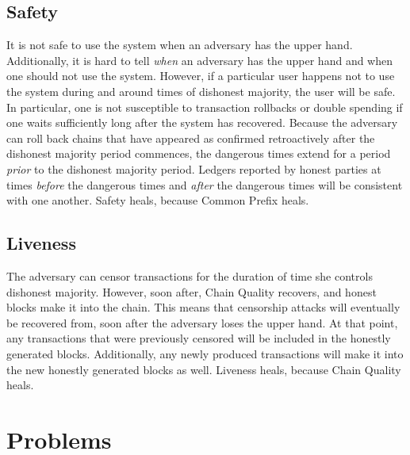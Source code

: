\subsection*{Safety}
It is not safe to use the system when an adversary has the upper hand. Additionally, it is
hard to tell \emph{when} an adversary has the upper hand and when one should not use the system.
However, if a particular user happens not to use the system during and around times of
dishonest majority, the user will be safe. In particular, one is not susceptible to
transaction rollbacks or double spending if one waits sufficiently long after the system
has recovered. Because the adversary can roll back chains that have appeared as confirmed
retroactively after the dishonest majority period commences, the dangerous times extend
for a period \emph{prior} to the dishonest majority period.
Ledgers reported by honest parties at times \emph{before}
the dangerous times and \emph{after} the dangerous times will be consistent with one another.
Safety heals, because Common Prefix heals.

\subsection*{Liveness}
The adversary can censor transactions for the duration of time she controls dishonest majority.
However, soon after, Chain Quality recovers, and honest blocks make it into the chain. This means
that censorship attacks will eventually be recovered from, soon after the adversary loses the upper
hand. At that point, any transactions that were previously censored will be included in the honestly
generated blocks. Additionally, any newly produced transactions will make it into the new honestly
generated blocks as well. Liveness heals, because Chain Quality heals.

\section*{Problems}


